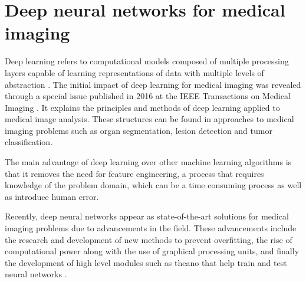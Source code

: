 \section{Deep neural networks for medical imaging}
Deep learning refers to computational models composed of multiple processing layers capable of learning representations of data with multiple levels of abstraction \cite{Goodfellow-et-al-2016}. The initial impact of deep learning for medical imaging was revealed through a special issue published in 2016 at the IEEE Transactions on Medical Imaging \cite{Greenspan2016}. It explains the principles and methods of deep learning applied to medical image analysis. These structures can be found in approaches to medical imaging problems such as organ segmentation, lesion detection and tumor classification. \par
The main advantage of deep learning over other machine learning algorithms is that it removes the need for feature engineering, a process that requires knowledge of the problem domain, which can be a time consuming process as well as introduce human error.\par
Recently, deep neural networks appear as state-of-the-art solutions for medical imaging problems due to advancements in the field. These advancements include the research and development of new methods to prevent overfitting, the rise of computational power along with the use of graphical processing units, and finally the development of high level modules such as theano \cite{Bastien} that help train and test neural networks . 
